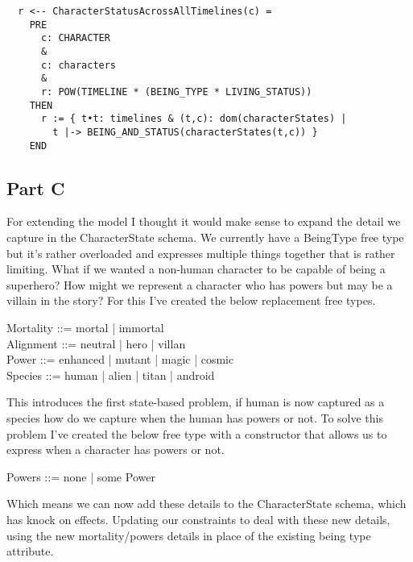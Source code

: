 \documentclass{article}
\begin{document}
\pagebreak
\begin{verbatim}
  r <-- CharacterStatusAcrossAllTimelines(c) =
    PRE
      c: CHARACTER
      &
      c: characters
      &
      r: POW(TIMELINE * (BEING_TYPE * LIVING_STATUS))
    THEN
      r := { t•t: timelines & (t,c): dom(characterStates) | 
        t |-> BEING_AND_STATUS(characterStates(t,c)) }
    END
\end{verbatim}

\pagebreak

\subsection*{Part C}

For extending the model I thought it would make sense to expand the detail we capture in the CharacterState schema. We currently have a BeingType free type but it’s rather overloaded and expresses multiple things together that is rather limiting. What if we wanted a non-human character to be capable of being a superhero? How might we represent a character who has powers but may be a villain in the story? For this I’ve created the below replacement free types.

\begin{zed}
Mortality ::= mortal | immortal \\
Alignment ::= neutral | hero | villan \\
Power ::= enhanced | mutant | magic | cosmic \\
Species ::= human | alien | titan | android \\
\end{zed}

\hspace{-0.64cm} This introduces the first state-based problem, if human is now captured as a species how do we capture when the human has powers or not. To solve this problem I’ve created the below free type with a constructor that allows us to express when a character has powers or not.

\begin{zed}
Powers ::= none | some \ldata Power \rdata \\
\end{zed}

\hspace{-0.64cm} Which means we can now add these details to the CharacterState schema, which has knock on effects. Updating our constraints to deal with these new details, using the new mortality/powers details in place of the existing being type attribute.
\end{document}

